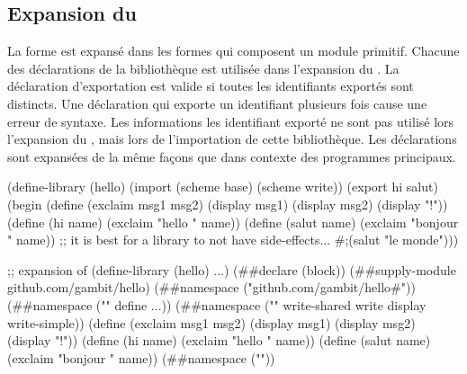 \subsection{Expansion du }

La forme  est expansé dans les formes qui composent un
module primitif. Chacune des déclarations de la bibliothèque est utilisée dans
l'expansion du . La déclaration d'exportation est
valide si toutes les identifiants exportés sont distincts. Une déclaration
 qui exporte un identifiant plusieurs fois cause une erreur de
syntaxe. Les informations les identifiant exporté ne sont pas utilisé lors
l'expansion du , mais lors de l'importation de cette
bibliothèque.  Les déclarations  sont expansées de la même
façons que dans contexte des programmes principaux.\\

\begin{center}
\begin{mplisting}{0.9}
(define-library (hello)
  (import (scheme base) (scheme write))
  (export hi salut)
  (begin
    (define (exclaim msg1 msg2)
      (display msg1)
      (display msg2)
      (display "!\n"))
    (define (hi name) (exclaim "hello " name))
    (define (salut name) (exclaim "bonjour " name))
    ;; it is best for a library to not have side-effects...
    #;(salut "le monde")))
\end{mplisting}
  \vspace*{4ex}
  \begin{mplisting}{0.9}
;; expansion of (define-library (hello) ...)
(##declare (block))
(##supply-module github.com/gambit/hello)
(##namespace ("github.com/gambit/hello#"))
(##namespace ("" define ...))
(##namespace ("" write-shared write display write-simple))
(define (exclaim msg1 msg2)
    (display msg1) (display msg2) (display "!\n"))
(define (hi name) (exclaim "hello " name))
(define (salut name) (exclaim "bonjour " name))
(##namespace (""))
\end{mplisting}
\end{center}

